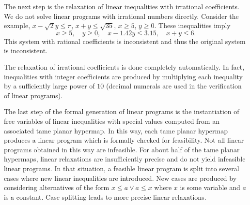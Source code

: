 The next step is the relaxation of linear inequalities with irrational
coefficients. We do not solve linear programs with
irrational numbers directly.  Consider the example, $x - \sqrt{2} y \le
\pi$, $x + y \le \sqrt{35}$, $x \ge 5$, $y \ge 0$. These inequalities imply
\begin{equation*}\label{eqn:35}
x\ge 5, \quad
y \ge 0, \quad
x - 1.42 y \le 3.15,\quad
x + y \le 6.
\end{equation*}
This system with rational coefficients is inconsistent and thus
the original system is inconsistent.

The relaxation of irrational coefficients is done completely
automatically. In fact, inequalities with integer coefficients are
produced by multiplying each inequality by a sufficiently large power
of $10$ (decimal numerals are used in the verification of linear
programs).

The last step of the formal generation of linear programs is the
instantiation of free variables of linear inequalities with special
values computed from an associated tame planar hypermap. In this way, each
tame planar hypermap produces a linear program which is formally checked for
feasibility. Not all linear programs obtained in this way are
infeasible.  For about half of the tame planar hypermaps, linear relaxations
are insufficiently precise and do not yield infeasible linear
programs.  In that situation, a feasible linear program is split into
several cases where new linear inequalities are introduced. New cases
are produced by considering alternatives of the form $x \le a \vee a
\le x$ where $x$ is some variable and $a$ is a constant.
Case splitting leads to more precise linear relaxations.

